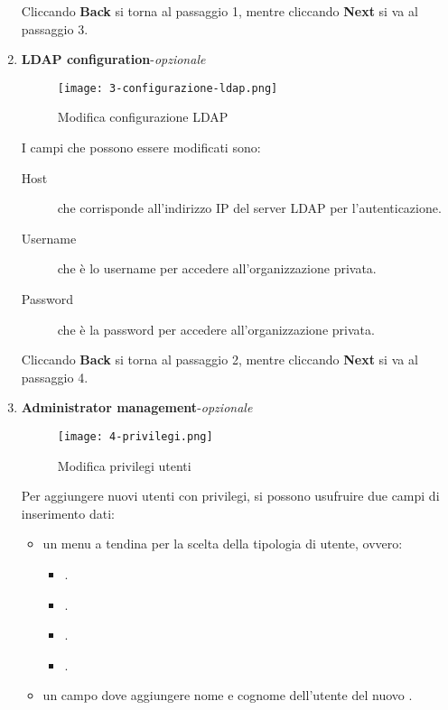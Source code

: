 \documentclass[../manuale-utente.tex]{subfiles}
\begin{document}
\begin{enumerate}
    Cliccando \textbf{Back} si torna al passaggio 1, mentre cliccando \textbf{Next} si va al passaggio 3.

    \item \textbf{LDAP configuration}-\textit{opzionale}

    \begin{figure}[H]
        \centering
        \texttt{[image: 3-configurazione-ldap.png]}
        \caption{Modifica configurazione LDAP}%
        \label{fig:web_app_modifica_configurazione_ldap}
    \end{figure}

    I campi che possono essere modificati sono:
    \begin{description}
        \item[Host] che corrisponde all'indirizzo IP del server LDAP per l'autenticazione.
        \item[Username] che è lo username per accedere all'organizzazione privata.
        \item[Password] che è la password per accedere all'organizzazione privata.
    \end{description}

    Cliccando \textbf{Back} si torna al passaggio 2, mentre cliccando \textbf{Next} si va al passaggio 4.

    \newpage
    \item \textbf{Administrator management}-\textit{opzionale}

    \begin{figure}[H]
        \centering
        \texttt{[image: 4-privilegi.png]}
        \caption{Modifica privilegi utenti}%
        \label{fig:web_app_modifica_privilegi_utenti}
    \end{figure}

    Per aggiungere nuovi utenti con privilegi, si possono usufruire due campi di inserimento dati:
    \begin{itemize}
        \item un menu a tendina per la scelta della tipologia di utente, ovvero:
        \begin{itemize}
            \item {}.
            \item {}.
            \item {}.
            \item {}.
        \end{itemize}
        \item un campo dove aggiungere nome e cognome dell'utente del nuovo .
    \end{itemize}


\end{enumerate}
\end{document}
